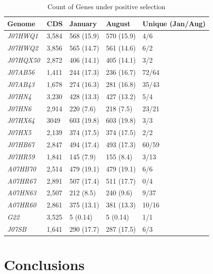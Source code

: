 \begin{table}[hbt]
  \caption{Count of Genes under positive selection}
  \begin{tabularx}{\textwidth}{L{2.2cm}R{2cm}R{3cm}R{3.2cm}R{2cm}}
  \hline
    \textbf{Genome} & \textbf{CDS} & \textbf{January} & \textbf{August} & \textbf{Unique (Jan/Aug)} \\
    \hline
     \textit{J07HWQ1} & 3,584 & 568 (15.9) & 570 (15.9) & 4/6 \\
     \textit{J07HWQ2} & 3,856 & 565 (14.7) & 561 (14.6) & 6/2 \\
     \textit{J07HQX50} & 2,872 & 406 (14.1) & 405 (14.1) & 3/2 \\
     \textit{J07AB56} & 1,411 & 244 (17.3) & 236 (16.7) & 72/64 \\
     \textit{J07AB43} & 1,678 & 274 (16.3) & 281 (16.8) & 35/43 \\
     \textit{J07HN4} & 3,230 & 428 (13.3) & 427 (13.2) & 5/4 \\
     \textit{J07HN6} & 2,914 & 220 (7.6) & 218 (7.5) & 23/21 \\
     \textit{J07HX64} & 3049 & 603 (19.8) & 603 (19.8) & 3/3 \\
     \textit{J07HX5} & 2,139 & 374 (17.5) & 374 (17.5) & 2/2 \\
     \textit{J07HB67} & 2,847 & 494 (17.4) & 493 (17.3) & 60/59 \\
     \textit{J07HR59} & 1,841 & 145 (7.9) & 155 (8.4) & 3/13 \\
     \textit{A07HB70} & 2,514 & 479 (19.1) & 479 (19.1) & 6/6 \\
     \textit{A07HR67} & 2,891 & 507 (17.4) & 511 (17.7) & 0/4 \\
     \textit{A07HN63} & 2,507 & 212 (8.5) & 240 (9.6) & 9/37 \\
     \textit{A07HR60} & 2,861 & 375 (13.1) & 381 (13.3) & 10/16 \\
     \textit{G22} & 3,525 & 5 (0.14) & 5 (0.14) & 1/1 \\
     \textit{J07SB} & 1,641 & 290 (17.7) & 287 (17.5) & 6/3 \\     
  \end{tabularx}
  \label{PSgenes}
\end{table}



\section{Conclusions}

